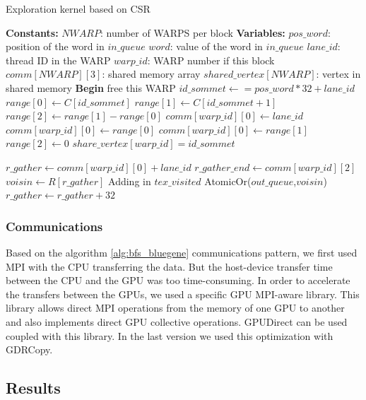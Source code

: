 \begin{algorithm}
\caption{Exploration kernel based on CSR}\label{alg:csr}
\begin{algorithmic}[1]
\State \textbf{Constants:}
\State $NWARP$: number of WARPS per block
\State 
\State \textbf{Variables:}
\State $pos\_word$: position of the word in $in\_queue$
\State $word$: value of the word in $in\_queue$
\State $lane\_id$: thread ID in the WARP
\State $warp\_id$: WARP number if this block
\State $comm[NWARP][3]$: shared memory array
\State $shared\_vertex[NWARP]$: vertex in shared memory
\State 
\State \textbf{Begin}
\State free this WARP
\EndIf
{}
\State $id\_sommet \gets = pos\_word*32+lane\_id$
\State $range[0] \gets C[id\_sommet]$ 
\State $range[1] \gets C[id\_sommet +1 ]$ 
\State $range[2] \gets range[1] - range[0]$ 
\EndIf
{}
\State $comm[warp\_id][0] \gets lane\_id$
\EndIf
{}
\State $comm[warp\_id][0] \gets range[0]$
\State $comm[warp\_id][0] \gets range[1]$
\State $range[2] \gets 0$
\State $share\_vertex[warp\_id] = id\_sommet$ 
\EndIf

\State $r\_gather \gets comm[warp\_id][0] + lane\_id$
\State $r\_gather\_end \gets comm[warp\_id][2] $
	\State $voisin \gets R[r\_gather]$
		\State Adding in $tex\_visited$
		\State AtomicOr($out\_queue$,$voisin$)
	\EndIf
	\State $r\_gather \gets r\_gather + 32$
\EndWhile
\EndWhile
\end{algorithmic}
\end{algorithm}

 
\subsubsection{Communications}

Based on the algorithm \ref{alg:bfs_bluegene} communications pattern, we first used MPI with the CPU transferring the data. But the host-device transfer time between the CPU and the GPU was too time-consuming. 
In order to accelerate the transfers between the GPUs, we used a specific GPU MPI-aware  library. This library allows direct MPI operations from the memory of one GPU to another and also implements direct GPU collective operations. 
GPUDirect can be used coupled with this library. In the last version we used this optimization with GDRCopy. 

\subsection{Results}

